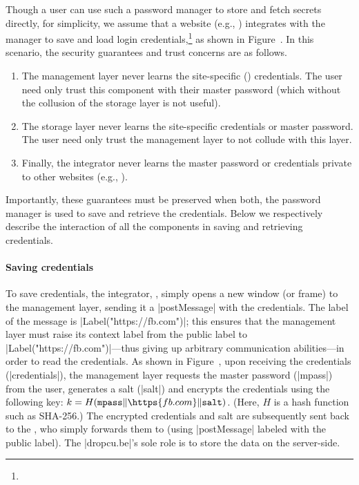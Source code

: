 %
Though a user can use such a password manager to store and fetch
secrets directly, for simplicity, we assume that a website (e.g.,
) integrates with the manager to save and load login
credentials,\footnote{
} as shown in Figure~.
%
In this scenario, the security guarantees and trust concerns are as follows.
\begin{enumerate}
\item The management layer never learns the site-specific
  () credentials. The user need only trust this
  component with their master password (which without the collusion
  of the storage layer is not useful).
\item The storage layer never learns the site-specific credentials
  or master password. The user need only trust the management layer to
  not collude with this layer.
\item Finally, the integrator never learns the master password or
  credentials private to other websites (e.g., ).
\end{enumerate}
%
Importantly, these guarantees must be preserved when both, the
password manager is used to save and retrieve the credentials.
%
Below we respectively describe the interaction of all the components
in saving and retrieving credentials.

\paragraph{Saving credentials}
%
To save credentials, the integrator, , simply opens a
new window (or frame) to the  management layer,
sending it a \js|postMessage| with the credentials. 
%
The label of the message is \js|Label("https://fb.com")|; this ensures
that the management layer must raise its context label from the public
label to \js|Label("https://fb.com")|---thus giving up arbitrary
communication abilities---in order to read the credentials.
%
As shown in Figure~, upon receiving the
credentials (\js|credentials|), the management layer requests the
master password (\js|mpass|) from the user, generates a salt
(\js|salt|) and encrypts the credentials using the following key:
$k = H(\texttt{mpass}\|\https{fb.com}\|\texttt{salt})$.
%
(Here, $H$ is a hash function such as SHA-256.)
%
The encrypted credentials and salt are subsequently sent back to the
, who simply forwards them to  (using
\js|postMessage| labeled with the public label). 
%
The \js|dropcu.be|'s sole role is to store the data on the
server-side.
%

